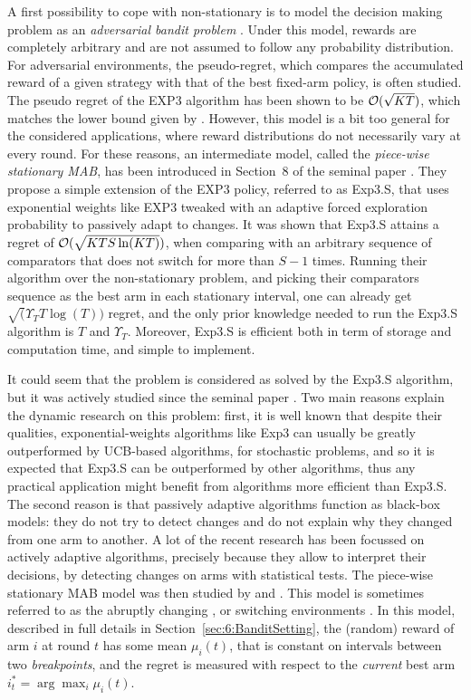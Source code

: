 A first possibility to cope with non-stationary is to model the decision making problem as an \emph{adversarial bandit problem} \cite{Auer02NonStochastic}. Under this model, rewards are completely arbitrary and are not assumed to follow any probability distribution.
For adversarial environments, the pseudo-regret, which compares the accumulated reward of a given strategy with that of the best fixed-arm policy, is often studied. The pseudo regret of the EXP3 algorithm has been shown to be $\mathcal{O}(\sqrt{KT})$, which matches the lower bound given by \cite{Auer02NonStochastic}.
However, this model is a bit too general for the considered applications, where reward distributions do not necessarily vary at every round.
For these reasons, an intermediate model, called the \emph{piece-wise stationary MAB}, has been introduced in Section~8 of the seminal paper \cite{Auer02NonStochastic}.
They propose a simple extension of the EXP3 policy, referred to as Exp3.S, that uses exponential weights like EXP3 tweaked with an adaptive forced exploration probability to passively adapt to changes.
It was shown that Exp3.S attains a regret of $\mathcal{O}(\sqrt{K T S \ln(K T)})$, when comparing with an arbitrary sequence of comparators that does not switch for more than $S-1$ times.
Running their algorithm over the non-stationary problem, and picking their comparators sequence as the best arm in each stationary interval, one can already get $\sqrt(\Upsilon_T T \log(T))$ regret, and the only prior knowledge needed to run the Exp3.S algorithm is $T$ and $\Upsilon_T$. Moreover, Exp3.S is efficient both in term of storage and computation time, and simple to implement.

It could seem that the problem is considered as solved by the Exp3.S algorithm, but it was actively studied since the seminal paper \cite{Auer02NonStochastic}.
Two main reasons explain the dynamic research on this problem:
first, it is well known that despite their qualities, exponential-weights algorithms like Exp3 can usually be greatly outperformed by UCB-based algorithms, for stochastic problems, and so it is expected that Exp3.S can be outperformed by other algorithms, thus any practical application might benefit from algorithms more efficient than Exp3.S.
%
The second reason is that passively adaptive algorithms function as black-box models: they do not try to detect changes and do not explain why they changed from one arm to another. A lot of the recent research has been focussed on actively adaptive algorithms, precisely because they allow to interpret their decisions, by detecting changes on arms with statistical tests.
The piece-wise stationary MAB model was then studied by \cite{Kocsis06} and \cite{YuMannor09}.
%
This model is sometimes referred to as the abruptly changing \cite{WeiSrivastava18Abruptly}, or switching environments \cite{MellorShapiro13}.
%
In this model, described in full details in Section~\ref{sec:6:BanditSetting}, the (random) reward of arm $i$ at round $t$ has some mean $\mu_i(t)$, that is constant on intervals between two \emph{breakpoints}, and the regret is measured with respect to the \emph{current} best arm $i_t^* = \arg\max_{i} \mu_i(t)$.

